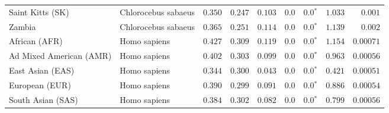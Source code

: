 \begin{center}
\begin{adjustbox}{width = 1\textwidth}
\begin{tabular}{|l|l|r|r|r|r|r|r|r|}
            Saint Kitts (SK)                  & Chlorocebus sabaeus        & $ 0.350$ & $ 0.247$ & $ 0.103$ & $0.0$ & $\bm{0.0{^*}}$ & $ 1.033$ & $ 0.001$ \\
            Zambia        & Chlorocebus sabaeus        & $ 0.365$ & $ 0.251$ & $ 0.114$ & $0.0$ & $\bm{0.0{^*}}$ & $ 1.139$ & $ 0.002$ \\
            African (AFR)               & Homo sapiens        & $ 0.427$ & $ 0.309$ & $ 0.119$ & $0.0$ & $\bm{0.0{^*}}$ & $ 1.154$ & $0.00071$ \\
            Ad Mixed American (AMR)                 & Homo sapiens        & $ 0.402$ & $ 0.303$ & $ 0.099$ & $0.0$ & $\bm{0.0{^*}}$ & $ 0.963$ & $0.00056$ \\
            East Asian (EAS)              & Homo sapiens        & $ 0.344$ & $ 0.300$ & $ 0.043$ & $0.0$ & $\bm{0.0{^*}}$ & $ 0.421$ & $0.00051$ \\
            European (EUR)              & Homo sapiens        & $ 0.390$ & $ 0.299$ & $ 0.091$ & $0.0$ & $\bm{0.0{^*}}$ & $ 0.886$ & $0.00054$ \\
            South Asian (SAS)              & Homo sapiens        & $ 0.384$ & $ 0.302$ & $ 0.082$ & $0.0$ & $\bm{0.0{^*}}$ & $ 0.799$ & $0.00056$ \\
            \bottomrule
        \end{tabular}
    \end{adjustbox}
    \newpage
\end{center}

